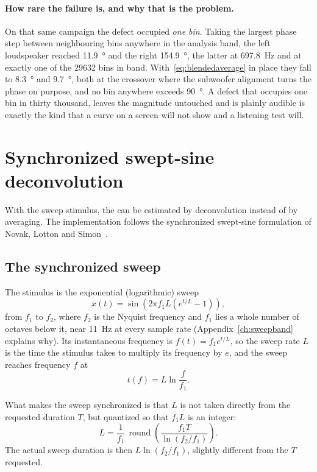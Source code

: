 \paragraph{How rare the failure is, and why that is the problem.} On that same campaign the defect occupied \emph{one bin}. Taking the largest phase step between neighbouring bins anywhere in the analysis band, the left loudspeaker reached \SI{11.9}{\degree} and the right \SI{154.9}{\degree}, the latter at \SI{697.8}{\hertz} and at exactly one of the \num{29632} bins in band. With~\eqref{eq:blendedaverage} in place they fall to \SI{8.3}{\degree} and \SI{9.7}{\degree}, both at the crossover where the subwoofer alignment turns the phase on purpose, and no bin anywhere exceeds \SI{90}{\degree}. A defect that occupies one bin in thirty thousand, leaves the magnitude untouched and is plainly audible is exactly the kind that a curve on a screen will not show and a listening test will.

\section{Synchronized swept-sine deconvolution}\label{sec:thsweep}
With the sweep stimulus, the  can be estimated by deconvolution instead of by  averaging. The implementation follows the synchronized swept-sine formulation of Novak, Lotton and Simon~\cite{Novak2015}.

\subsection{The synchronized sweep}\label{sec:syncsweep}
The stimulus is the exponential (logarithmic) sweep
\begin{equation}
  x(t) = \sin\!\left( 2\pi f_1 L \left( e^{t/L} - 1 \right) \right),
  \label{eq:sweep}
\end{equation}
from $f_1$ to $f_2$, where $f_2$ is the Nyquist frequency and $f_1$ lies a whole number of octaves below it, near \SI{11}{\hertz} at every sample rate (Appendix~\ref{ch:sweepband} explains why). Its instantaneous frequency is $f(t) = f_1 e^{t/L}$, so the sweep rate $L$ is the time the stimulus takes to multiply its frequency by $e$, and the sweep reaches frequency $f$ at
\begin{equation}
  t(f) = L \ln \frac{f}{f_1}.
  \label{eq:sweeptime}
\end{equation}

What makes the sweep synchronized is that $L$ is not taken directly from the requested duration $T$, but quantized so that $f_1 L$ is an integer:
\begin{equation}
  L = \frac{1}{f_1}\,
      \operatorname{round}\!\left( \frac{f_1 T}{\ln (f_2/f_1)} \right).
  \label{eq:sweepL}
\end{equation}
The actual sweep duration is then $L \ln (f_2/f_1)$, slightly different from the $T$ requested.

